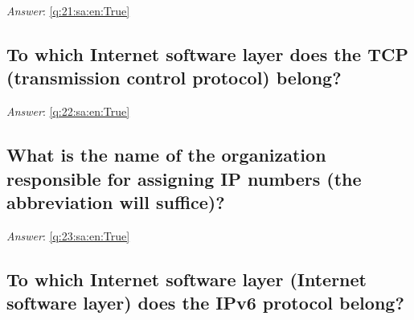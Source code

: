 \documentclass[a4paper,11pt,oneside]{article}
\begin{document}
\begin{sloppypar}
\label{q:21:sa:en:False}

\vspace{2cm}

\noindent\makebox[\textwidth]{\hrulefill}

\vspace{1cm}

\textit{Answer}: \autoref{q:21:sa:en:True}



\subsection{To which Internet software layer does the TCP (transmission control protocol) belong?}

\label{q:22:sa:en:False}

\vspace{2cm}

\noindent\makebox[\textwidth]{\hrulefill}

\vspace{1cm}

\textit{Answer}: \autoref{q:22:sa:en:True}



\subsection{What is the name of the organization responsible for assigning IP numbers (the abbreviation will suffice)?}

\label{q:23:sa:en:False}

\vspace{2cm}

\noindent\makebox[\textwidth]{\hrulefill}

\vspace{1cm}

\textit{Answer}: \autoref{q:23:sa:en:True}



\subsection{To which Internet software layer (Internet software layer) does the IPv6 protocol belong?}

\label{q:24:sa:en:False}

\vspace{2cm}

\noindent\makebox[\textwidth]{\hrulefill}

\vspace{1cm}


\end{sloppypar}
\end{document}
